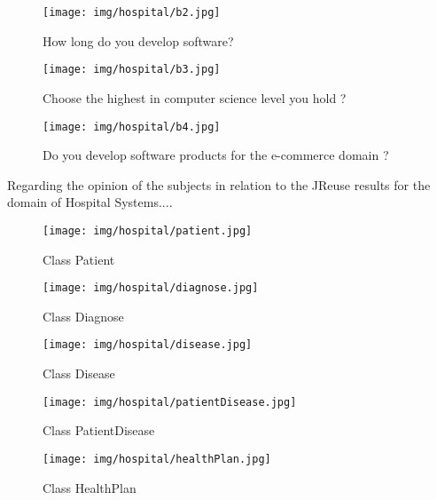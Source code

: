 \begin{figure}[!h]
\centering
\texttt{[image: img/hospital/b2.jpg]}
\caption{How long do you develop software?}
\label{fig:backHospital-2}
\end{figure}






\begin{figure}[!h]
\centering
\texttt{[image: img/hospital/b3.jpg]}
\caption{Choose the  highest  in  computer science level you hold ?}
\label{fig:backHospital-3}
\end{figure}





\begin{figure}[!h]
\centering
\texttt{[image: img/hospital/b4.jpg]}
\caption{Do you develop software products for the e-commerce domain ?}
\label{fig:backHospital-4}
\end{figure}


Regarding the opinion of the subjects in relation to the JReuse results for the domain of Hospital Systems....


\begin{figure}[!h]
\centering
\texttt{[image: img/hospital/patient.jpg]}
\caption{Class Patient}
\label{fig:hospitalPatient}
\end{figure}




\begin{figure}[!h]
\centering
\texttt{[image: img/hospital/diagnose.jpg]}
\caption{Class Diagnose}
\label{fig:hospitalDiagnose}
\end{figure}




\begin{figure}[!h]
\centering
\texttt{[image: img/hospital/disease.jpg]}
\caption{Class Disease}
\label{fig:hospitalDisease}
\end{figure}




\begin{figure}[!h]
\centering
\texttt{[image: img/hospital/patientDisease.jpg]}
\caption{Class PatientDisease}
\label{fig:hospitalPatientDisease}
\end{figure}




\begin{figure}[!h]
\centering
\texttt{[image: img/hospital/healthPlan.jpg]}
\caption{Class HealthPlan}
\label{fig:hospitalHealthPlan}
\end{figure}




